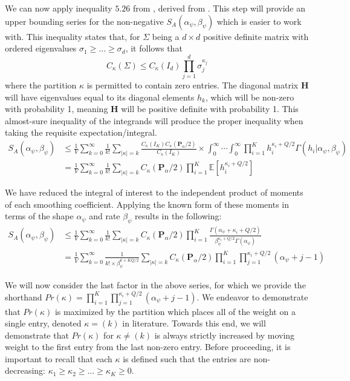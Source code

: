 \documentclass[12pt]{article}
\begin{document}
We can now apply inequality $5.26$ from \cite{bagyan_complete_2024}, derived from \cite{faraut_analysis_1994}. This step will provide an upper bounding series for the non-negative $S_A(\alpha_\psi, \beta_\psi)$ which is easier to work with. This inequality states that, for $\Sigma$ being a $d \times d$ positive definite matrix with ordered eigenvalues $\sigma_1 \geq \ldots \geq \sigma_d$, it follows that 
$$C_\kappa(\Sigma) \leq C_\kappa (I_d) \prod_{j = 1 }^d \sigma_j^{\kappa_j}$$
\noindent where the partition $\kappa$ is permitted to contain zero entries. The diagonal matrix $\mathbf{H}$ will have eigenvalues equal to its diagonal elements $h_k$, which will be non-zero with probability 1, meaning $\mathbf{H}$ will be positive definite with probability 1. This almost-sure inequality of the integrands will produce the proper inequality when taking the requisite expectation/integral.
\begin{align*}
    S_A(\alpha_\psi, \beta_\psi) & \leq  \frac{1}{V} \sum_{k = 0}^\infty \frac{1}{k!} \sum_{|\kappa| = k} \frac{C_\kappa(I_K)C_\kappa(\mathbf{P}_\alpha/2)}{C_\kappa(I_K)} \times \int_0^\infty \cdots \int_0^\infty \prod_{i = 1}^K h_i^{\kappa_i + Q/2} \Gamma(h_i| \alpha_\psi, \beta_\psi)\\
    & = \frac{1}{V} \sum_{k = 0}^\infty \frac{1}{k!} \sum_{|\kappa| = k} C_\kappa(\mathbf{P}_\alpha/2) \prod_{i = 1}^K \mathbb{E}[h_i^{\kappa_i + Q/2}]
\end{align*}

We have reduced the integral of interest to the independent product of moments of each smoothing coefficient. Applying the known form of these moments in terms of the shape $\alpha_\psi$ and rate $\beta_\psi$ results in the following:
\begin{align*}
    S_A(\alpha_\psi, \beta_\psi) & \leq \frac{1}{V} \sum_{k = 0}^\infty \frac{1}{k!} \sum_{|\kappa| = k} C_\kappa(\mathbf{P}_\alpha/2) \prod_{i = 1}^K \frac{\Gamma(\alpha_\psi + \kappa_i + Q/2)}{\beta_\psi^{\kappa_i + Q/2}\Gamma(\alpha_\psi)}\\
    & = \frac{1}{V}\sum_{k = 0}^\infty \frac{1}{k! \times \beta_\psi^{k + KQ/2}} \sum_{|\kappa| = k} C_\kappa(\mathbf{P}_\alpha/2) \prod_{i = 1}^K \prod_{j = 1}^{\kappa_i + Q/2}(\alpha_\psi + j - 1)
\end{align*}

We will now consider the last factor in the above series, for which we provide the shorthand $Pr(\kappa) = \prod_{i = 1}^K \prod_{j = 1}^{\kappa_i + Q/2}(\alpha_\psi + j - 1)$. We endeavor to demonstrate that $Pr(\kappa)$ is maximized by the partition which places all of the weight on a single entry, denoted $\kappa = (k)$ in literature. Towards this end, we will demonstrate that $Pr(\kappa)$ for $\kappa \neq (k)$ is always strictly increased by moving weight to the first entry from the last non-zero entry. Before proceeding, it is important to recall that each $\kappa$ is defined such that the entries are non-decreasing: $\kappa_1 \geq \kappa_2 \geq \ldots \geq \kappa_K \geq 0$.
\end{document}
